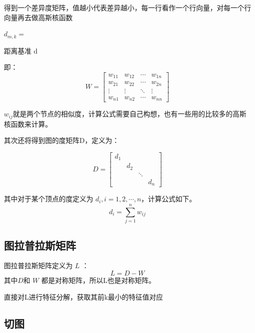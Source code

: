 \documentclass{article}
\begin{document}
得到一个差异度矩阵，值越小代表差异越小，每一行看作一个行向量，对每一个行向量再去做高斯核函数


$d_{m,k} = $

距离基准 d




即：
\begin{equation*}
W = 
\begin{bmatrix}
w_{11} & w_{12} & \cdots & w_{1n} \\
w_{21} & w_{22} & \cdots & w_{2n} \\
\vdots & \vdots & \ddots & \vdots \\
w_{n1} & w_{n2} & \cdots & w_{nn} 
\end{bmatrix}
\tag{1}
\end{equation*}

$w_{ij}$就是两个节点的相似度，计算公式需要自己构想，也有一些用的比较多的高斯核函数来计算。

其次还将得到图的度矩阵D，定义为：

\begin{equation*}
D = 
\begin{bmatrix}
d_{1} &  &  &  \\
 & d_{2} &  &  \\
 &  & \ddots &  \\
 &  &  & d_{n} 
\end{bmatrix}
\tag{2}
\end{equation*}


其中对于某个顶点的度定义为 $d_{i},i = 1,2,\cdots,n$，计算公式如下。
\begin{equation}
d_{i} = \sum^{n}_{j=1}w_{ij} \tag{3}
\end{equation}

\subsection{图拉普拉斯矩阵}
图拉普拉斯矩阵定义为 $L$ ：
\begin{equation}
L = D - W \tag{4}
\end{equation}
其中$D$和 $W$ 都是对称矩阵，所以L也是对称矩阵。


直接对L进行特征分解，获取其前k最小的特征值对应

\subsection{切图}
\end{document}
